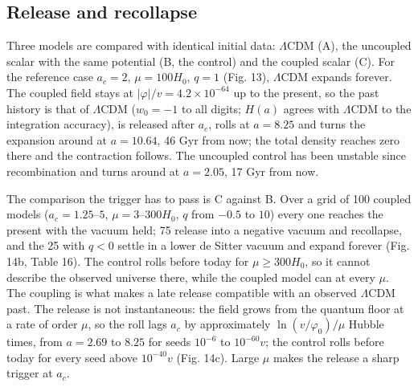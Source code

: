 \documentclass[11pt,a4paper]{article}
\begin{document}
\subsection{Release and recollapse}
Three models are compared with identical initial data: $\Lambda$CDM (A), the uncoupled scalar with the same potential (B, the control) and the coupled scalar (C). For the reference case $a_c=2$, $\mu=100H_0$, $q=1$ (Fig. 13), $\Lambda$CDM expands forever. The coupled field stays at $|\varphi|/v=4.2\times10^{-64}$ up to the present, so the past history is that of $\Lambda$CDM ($w_0=-1$ to all digits; $H(a)$ agrees with $\Lambda$CDM to the integration accuracy), is released after $a_c$, rolls at $a=8.25$ and turns the expansion around at $a=10.64$, 46 Gyr from now; the total density reaches zero there and the contraction follows. The uncoupled control has been unstable since recombination and turns around at $a=2.05$, 17 Gyr from now.

The comparison the trigger has to pass is C against B. Over a grid of 100 coupled models ($a_c=1.25$--$5$, $\mu=3$--$300H_0$, $q$ from $-0.5$ to $10$) every one reaches the present with the vacuum held; 75 release into a negative vacuum and recollapse, and the 25 with $q<0$ settle in a lower de Sitter vacuum and expand forever (Fig. 14b, Table 16). The control rolls before today for $\mu\ge300H_0$, so it cannot describe the observed universe there, while the coupled model can at every $\mu$. The coupling is what makes a late release compatible with an observed $\Lambda$CDM past. The release is not instantaneous: the field grows from the quantum floor at a rate of order $\mu$, so the roll lags $a_c$ by approximately $\ln(v/\varphi_0)/\mu$ Hubble times, from $a=2.69$ to $8.25$ for seeds $10^{-6}$ to $10^{-60}v$; the control rolls before today for every seed above $10^{-40}v$ (Fig. 14c). Large $\mu$ makes the release a sharp trigger at $a_c$.
\end{document}
